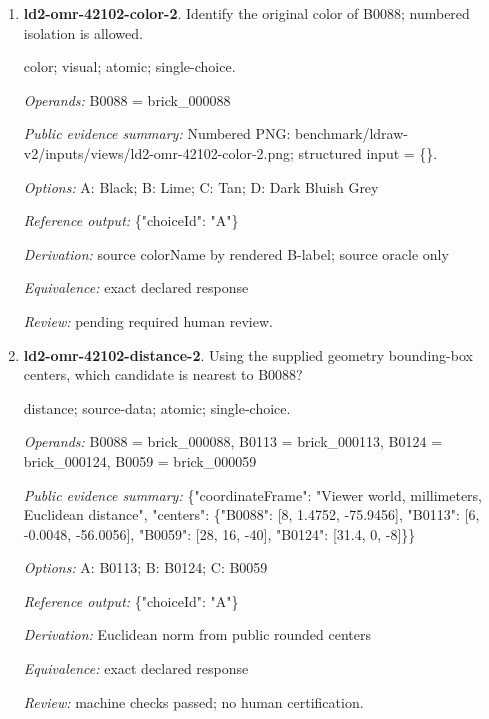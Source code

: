 \begin{enumerate}
\par{\small distance; source-data; atomic; single-choice.\par\textit{Operands:} B0094 = brick\_000094, B0019 = brick\_000019, B0053 = brick\_000053, B0045 = brick\_000045\par\textit{Public evidence summary:} \{"coordinateFrame": "Viewer world, millimeters, Euclidean distance", "centers": \{"B0094": [8, 20.569662, -71.488617], "B0045": [8, 28.592, 18.5592], "B0019": [12, 32, -56], "B0053": [8, 32.496, -13.2168]\}\}\par\textit{Options:} A: B0045; B: B0053; C: B0019\par\textit{Reference output:} \{"choiceId": "C"\}\par\textit{Derivation:} Euclidean norm from public rounded centers\par\textit{Equivalence:} exact declared response\par\textit{Review:} machine checks passed; no human certification.}
\item \textbf{ld2-omr-42102-color-2}. Identify the original color of B0088; numbered isolation is allowed.
\par{\small color; visual; atomic; single-choice.\par\textit{Operands:} B0088 = brick\_000088\par\textit{Public evidence summary:} Numbered PNG: benchmark/ldraw-v2/inputs/views/ld2-omr-42102-color-2.png; structured input = \{\}.\par\textit{Options:} A: Black; B: Lime; C: Tan; D: Dark Bluish Grey\par\textit{Reference output:} \{"choiceId": "A"\}\par\textit{Derivation:} source colorName by rendered B-label; source oracle only\par\textit{Equivalence:} exact declared response\par\textit{Review:} pending required human review.}
\item \textbf{ld2-omr-42102-distance-2}. Using the supplied geometry bounding-box centers, which candidate is nearest to B0088?
\par{\small distance; source-data; atomic; single-choice.\par\textit{Operands:} B0088 = brick\_000088, B0113 = brick\_000113, B0124 = brick\_000124, B0059 = brick\_000059\par\textit{Public evidence summary:} \{"coordinateFrame": "Viewer world, millimeters, Euclidean distance", "centers": \{"B0088": [8, 1.4752, -75.9456], "B0113": [6, -0.0048, -56.0056], "B0059": [28, 16, -40], "B0124": [31.4, 0, -8]\}\}\par\textit{Options:} A: B0113; B: B0124; C: B0059\par\textit{Reference output:} \{"choiceId": "A"\}\par\textit{Derivation:} Euclidean norm from public rounded centers\par\textit{Equivalence:} exact declared response\par\textit{Review:} machine checks passed; no human certification.}

\end{enumerate}
